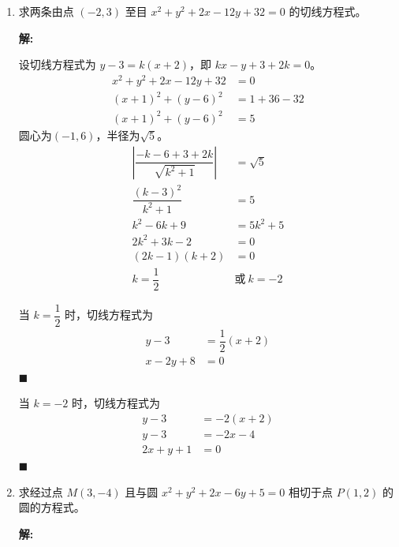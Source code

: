 \documentclass[10pt]{article}
\newcommand{\sol}{\textbf{解:} }
\begin{document}
\begin{enumerate}[leftmargin=*]
  \item 求两条由点 $(-2,3)$ 至目 $x^{2}+y^{2}+2 x-12 y+32=0$ 的切线方程式。

        \sol{}

        设切线方程式为 $y - 3 = k(x + 2)$，即 $kx - y + 3 + 2k = 0$。
        \begin{align*}
          x^{2}+y^{2}+2 x-12 y+32 & = 0       \\
          (x+1)^{2}+(y-6)^{2}     & = 1+36-32 \\
          (x+1)^{2}+(y-6)^{2}     & = 5
        \end{align*}
        圆心为$(-1, 6)$，半径为$\sqrt{5}$。
        \begin{align*}
          \left\vert \dfrac{-k - 6 + 3 + 2k}{\sqrt{k^{2} + 1}} \right\vert & = \sqrt{5}       \\
          \dfrac{(k - 3)^{2}}{k^{2} + 1}                                   & = 5              \\
          k^{2} - 6k + 9                                                   & = 5k^{2} + 5     \\
          2k^{2} + 3k - 2                                                  & = 0              \\
          (2k - 1)(k + 2)                                                  & = 0              \\
          k = \dfrac{1}{2}                                                 & \text{或}\ k = -2
        \end{align*}

        当 $k = \dfrac{1}{2}$ 时，切线方程式为
        \begin{align*}
          y - 3      & = \dfrac{1}{2}(x + 2) \\
          x - 2y + 8 & = 0
        \end{align*} \hfill$\blacksquare$

        当 $k = -2$ 时，切线方程式为
        \begin{align*}
          y - 3      & = -2(x + 2) \\
          y - 3      & = -2x - 4   \\
          2x + y + 1 & = 0
        \end{align*} \hfill$\blacksquare$

  \item 求经过点 $M(3,-4)$ 且与圆 $x^{2}+y^{2}+2 x-6 y+5=0$ 相切于点 $P(1,2)$ 的圆的方程式。

        \sol{}


\end{enumerate}
\end{document}
